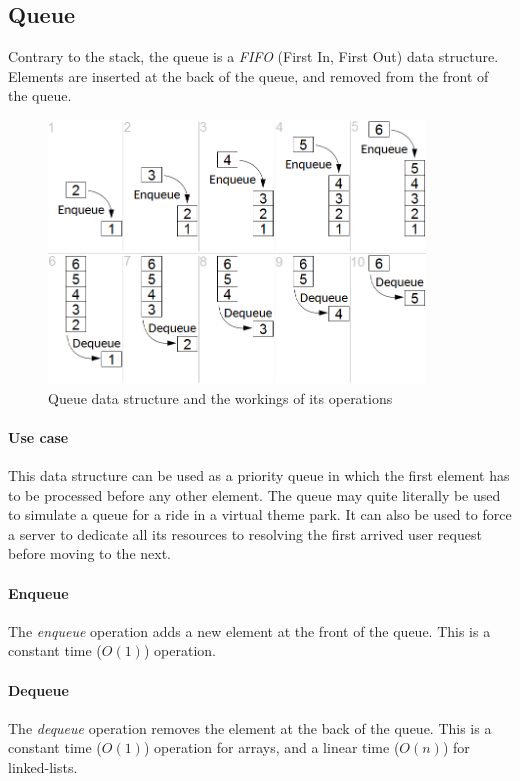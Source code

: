 \documentclass{article}
\begin{document}


\subsection{Queue}
Contrary to the stack, the queue is a {\em FIFO} (First In, First Out) data structure.
Elements are inserted at the back of the queue, and removed from the front of the queue.

\begin{figure}[H]
  \centering
  \includegraphics[width=10cm]{queue}
  \caption{Queue data structure and the workings of its operations}
\end{figure}

\paragraph{Use case}
This data structure can be used as a priority queue in which the first element has to be processed before any other element.
The queue may quite literally be used to simulate a queue for a ride in a virtual theme park. It can also be used to force a
server to dedicate all its resources to resolving the first arrived user request before moving to the next.

\paragraph{Enqueue}
The {\em enqueue} operation adds a new element at the front of the queue.
This is a constant time (\(O(1)\)) operation.

\paragraph{Dequeue}
The {\em dequeue} operation removes the element at the back of the queue.
This is a constant time (\(O(1)\)) operation for arrays, and a linear time (\(O(n)\)) for linked-lists.
\end{document}
